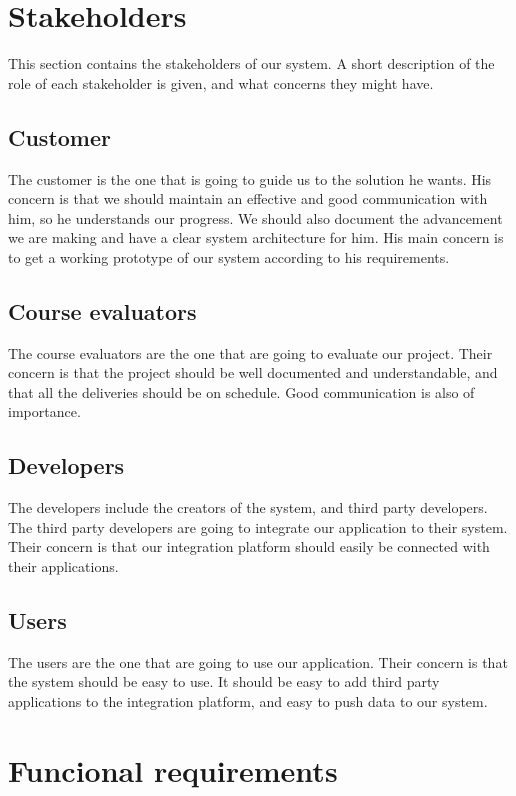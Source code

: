 
\section{Stakeholders}
\label{section:stakeholders}

This section contains the stakeholders of our system.
A short description of the role of each stakeholder is given, and what concerns they might have.

\subsection{Customer}
The customer is the one that is going to guide us to the solution he wants.
His concern is that we should maintain an effective and good communication with him, so he understands our progress.
We should also document the advancement we are making and have a clear system architecture for him.
His main concern is to get a working prototype of our system according to his requirements.

\subsection{Course evaluators}
The course evaluators are the one that are going to evaluate our project. 
Their concern is that the project should be well documented and understandable, and that all the deliveries should be on schedule.
Good communication is also of importance.

\subsection{Developers}
The developers include the creators of the system, and third party developers.
The third party developers are going to integrate our application to their system.
Their concern is that our integration platform should easily be connected with their applications.

\subsection{Users}
The users are the one that are going to use our application.
Their concern is that the system should be easy to use.
It should be easy to add third party applications to the integration platform, and easy to push data to our system.

\newpage
\section{Funcional requirements}
\label{section:functionalreq}


